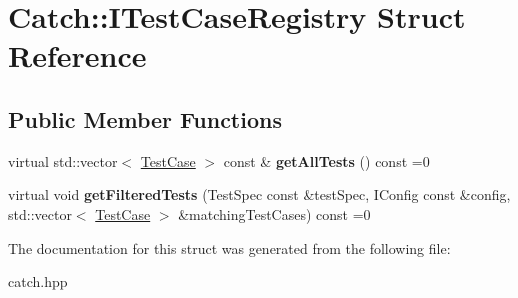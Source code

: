 \hypertarget{structCatch_1_1ITestCaseRegistry}{
\section{Catch::ITestCaseRegistry Struct Reference}
\label{structCatch_1_1ITestCaseRegistry}
}
\subsection*{Public Member Functions}
\begin{DoxyCompactItemize}
\item 
\hypertarget{structCatch_1_1ITestCaseRegistry_ad6e4d4a621655123f73ae98cfeda063d}{
virtual std::vector$<$ \hyperlink{classCatch_1_1TestCase}{TestCase} $>$ const \& {\bfseries getAllTests} () const =0}
\label{structCatch_1_1ITestCaseRegistry_ad6e4d4a621655123f73ae98cfeda063d}

\item 
\hypertarget{structCatch_1_1ITestCaseRegistry_a625038a4f698f057503782016cbd0664}{
virtual void {\bfseries getFilteredTests} (TestSpec const \&testSpec, IConfig const \&config, std::vector$<$ \hyperlink{classCatch_1_1TestCase}{TestCase} $>$ \&matchingTestCases) const =0}
\label{structCatch_1_1ITestCaseRegistry_a625038a4f698f057503782016cbd0664}

\end{DoxyCompactItemize}


The documentation for this struct was generated from the following file:\begin{DoxyCompactItemize}
\item 
catch.hpp\end{DoxyCompactItemize}
